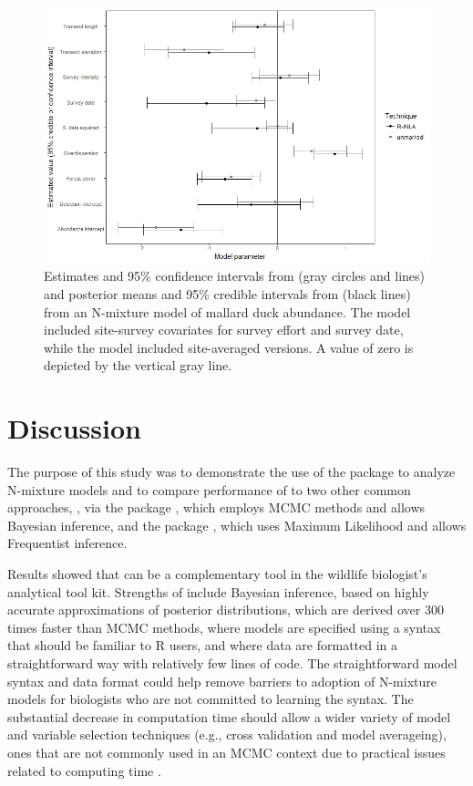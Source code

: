 \documentclass[article]{jss}
\begin{document}
\begin{figure}
  \includegraphics[width=\linewidth]{fig3.jpeg}
  \caption{Estimates and 95\% confidence intervals from  (gray circles and lines) and posterior means and 95\% credible intervals from  (black lines) from an N-mixture model of mallard duck abundance.  The  model included site-survey covariates for survey effort and survey date, while the  model included site-averaged versions.  A value of zero is depicted by the vertical gray line.}
  \label{fig:fig3}
\end{figure}

\section[Discussion]{Discussion}
The purpose of this study was to demonstrate the use of the  package \citep{Rue_Martino_Lindgren_Simpson_Riebler_2013} to analyze N-mixture models and to compare performance of  to two other common approaches,  \citep{Lunn_Jackson_Best_Thomas_Spiegelhalter_2012}, via the  package \citep{Denwood_2016}, which employs MCMC methods and allows Bayesian inference, and the  package \citep{Fiske_Chandler_others_2011}, which uses Maximum Likelihood and allows Frequentist inference.

Results showed that  can be a complementary tool in the wildlife biologist's analytical tool kit.  Strengths of  include Bayesian inference, based on highly accurate approximations of posterior distributions, which are derived over 300 times faster than MCMC methods, where models are specified using a syntax that should be familiar to R users, and where data are formatted in a straightforward way with relatively few lines of code.  The straightforward model syntax and data format could help remove  barriers to adoption of N-mixture models for biologists who are not committed to learning the  syntax.  The substantial decrease in computation time should allow a wider variety of model and variable selection techniques (e.g., cross validation and model averageing), ones that are not commonly used in an MCMC context due to practical issues related to computing time \citep{Kery_Schaub_2011}.
\end{document}
